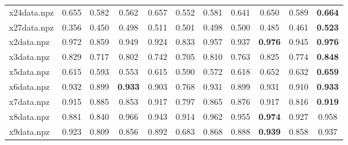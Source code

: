 \documentclass{article}
\begin{document}
\begin{table}[htbp]
\begin{adjustbox}{width=\textwidth}
\begin{tabular}{lcccccccccc}
x24data.npz & 0.655 & 0.582 & 0.562 & 0.657 & 0.552 & 0.581 & 0.641 & 0.650 & 0.589 & \cellcolor{graybg}\textbf{0.664} \\
x27data.npz & 0.356 & 0.450 & 0.498 & 0.511 & 0.501 & 0.498 & 0.500 & 0.485 & 0.461 & \cellcolor{graybg}\textbf{0.523} \\
x2data.npz & 0.972 & 0.859 & 0.949 & 0.924 & 0.833 & 0.957 & 0.937 & \cellcolor{graybg}\textbf{0.976} & 0.945 & \cellcolor{graybg}\textbf{0.976} \\
x3data.npz & 0.829 & 0.717 & 0.802 & 0.742 & 0.705 & 0.810 & 0.763 & 0.825 & 0.774 & \cellcolor{graybg}\textbf{0.848} \\
x5data.npz & 0.615 & 0.593 & 0.553 & 0.615 & 0.590 & 0.572 & 0.618 & 0.652 & 0.632 & \cellcolor{graybg}\textbf{0.659} \\
x6data.npz & 0.932 & 0.899 & \cellcolor{graybg}\textbf{0.933} & 0.903 & 0.768 & 0.931 & 0.899 & 0.931 & 0.910 & \cellcolor{graybg}\textbf{0.933} \\
x7data.npz & 0.915 & 0.885 & 0.853 & 0.917 & 0.797 & 0.865 & 0.876 & 0.917 & 0.816 & \cellcolor{graybg}\textbf{0.919} \\
x8data.npz & 0.881 & 0.840 & 0.966 & 0.943 & 0.914 & 0.962 & 0.955 & \cellcolor{graybg}\textbf{0.974} & 0.927 & 0.958 \\
x9data.npz & 0.923 & 0.809 & 0.856 & 0.892 & 0.683 & 0.868 & 0.888 & \cellcolor{graybg}\textbf{0.939} & 0.858 & 0.937 \\
\hline
\end{tabular}
\end{adjustbox}
\end{table}
\end{document}
